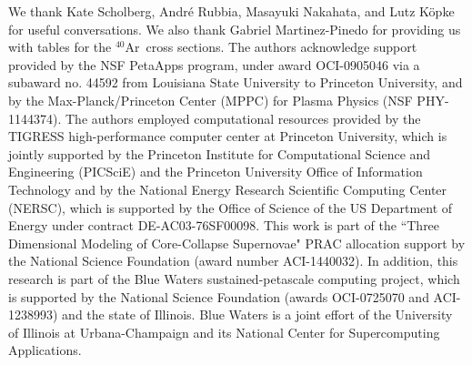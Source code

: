 \documentclass[iop,apj,appendixfloats]{emulateapj}
\def\ar40{$^{40}$Ar}
\begin{document}
\acknowledgments

We thank Kate Scholberg, Andr\'e Rubbia, Masayuki Nakahata, and 
Lutz K\"opke
for useful conversations.
We also thank Gabriel Martinez-Pinedo for providing us with tables
for the \ar40\ cross sections.
The authors acknowledge support provided by the NSF PetaApps 
program, under award OCI-0905046 via a subaward no. 44592 from 
Louisiana State University to Princeton University, and by the 
Max-Planck/Princeton Center (MPPC) for Plasma Physics 
(NSF PHY-1144374). The authors employed computational resources 
provided by the TIGRESS high-performance computer center at 
Princeton University, which is jointly supported by the Princeton 
Institute for Computational Science and Engineering (PICSciE) and 
the Princeton University Office of Information Technology and by 
the National Energy Research Scientific Computing Center (NERSC), 
which is supported by the Office of Science of the US Department 
of Energy under contract DE-AC03-76SF00098. This work is part of 
the ``Three Dimensional Modeling of Core-Collapse Supernovae" PRAC 
allocation support by the National Science Foundation (award number 
ACI-1440032). In addition, this research is part of the Blue Waters 
sustained-petascale computing project, which is supported by the 
National Science Foundation (awards OCI-0725070 and ACI-1238993) 
and the state of Illinois. Blue Waters is a joint effort of the 
University of Illinois at Urbana-Champaign and its National Center 
for Supercomputing Applications.





\begin{appendix}
\setcounter{table}{0}
\renewcommand{\thetable}{A\arabic{table}}
\renewcommand{\theequation}{A\arabic{equation}}

\end{appendix}


\end{document}
